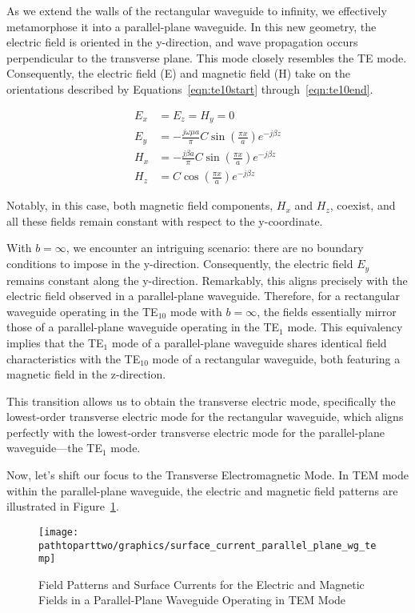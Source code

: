 As we extend the walls of the rectangular waveguide to infinity, we effectively metamorphose it into a parallel-plane waveguide. In this new geometry, the electric field is oriented in the y-direction, and wave propagation occurs perpendicular to the transverse plane. This mode closely resembles the TE mode. Consequently, the electric field (E) and magnetic field (H) take on the orientations described by Equations~\eqref{eqn:te10start} through~\eqref{eqn:te10end}.

\begin{align}
E_x &= E_z = H_y = 0\label{eqn:te10start}\\
E_y &= -\frac{j\omega \mu a}{\pi}C\sin(\frac{\pi x}{a})e^{-j\beta z}\\
H_x &= -\frac{j\beta a}{\pi}C\sin(\frac{\pi x}{a})e^{-j\beta z}\\
H_z &= C\cos(\frac{\pi x}{a})e^{-j\beta z}\label{eqn:te10end}
\end{align}

Notably, in this case, both magnetic field components, $H_x$ and $H_z$, coexist, and all these fields remain constant with respect to the y-coordinate.

With $b=\infty$, we encounter an intriguing scenario: there are no boundary conditions to impose in the y-direction. Consequently, the electric field $E_y$ remains constant along the y-direction. Remarkably, this aligns precisely with the electric field observed in a parallel-plane waveguide. Therefore, for a rectangular waveguide operating in the TE$_{10}$ mode with $b=\infty$, the fields essentially mirror those of a parallel-plane waveguide operating in the TE$_1$ mode. This equivalency implies that the TE$_1$ mode of a parallel-plane waveguide shares identical field characteristics with the TE$_{10}$ mode of a rectangular waveguide, both featuring a magnetic field in the z-direction.

This transition allows us to obtain the transverse electric mode, specifically the lowest-order transverse electric mode for the rectangular waveguide, which aligns perfectly with the lowest-order transverse electric mode for the parallel-plane waveguide—the TE$_1$ mode.

Now, let's shift our focus to the Transverse Electromagnetic Mode. In TEM mode within the parallel-plane waveguide, the electric and magnetic field patterns are illustrated in Figure~\ref{fig:page4}.

\begin{figure}[h]
\centering
\texttt{[image: \\pathtoparttwo/graphics/surface\_current\_parallel\_plane\_wg\_temp]}
\caption{Field Patterns and Surface Currents for the Electric and Magnetic Fields in a Parallel-Plane Waveguide Operating in TEM Mode}
\label{fig:page4}
\end{figure}

